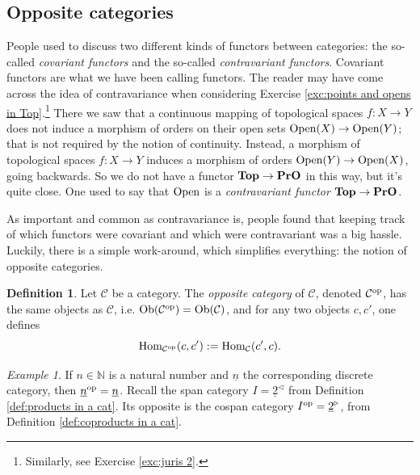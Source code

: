 \documentclass{book}
\def\tn{\textnormal}
\def\mc{\mathcal}
\def\NN{{\mathbb N}}
\def\Hom{\tn{Hom}}
\def\Ob{\tn{Ob}}
\def\Op{\tn{Open}}
\def\lcone{^\triangleleft}
\def\rcone{^\triangleright}
\def\to{\rightarrow}
\def\taking{\colon}
\def\op{^\tn{op}}
\def\ul{\underline}
\def\Top{{\bf Top}}
\def\PrO{{\bf PrO}}
\def\mcC{\mc{C}}
\theoremstyle{remark}
\newtheorem{example}[subsubsection]{Example}
\theoremstyle{definition}
\newtheorem{definition}[subsubsection]{Definition}
\begin{document}

\subsection{Opposite categories}\label{sec:opposite}

People used to discuss two different kinds of functors between categories: the so-called {\em covariant functors} and the so-called {\em contravariant functors}. Covariant functors are what we have been calling functors. The reader may have come across the idea of contravariance when considering Exercise \ref{exc:points and opens in Top}.\footnote{Similarly, see Exercise \ref{exc:juris 2}.} There we saw that a continuous mapping of topological spaces $f\taking X\to Y$ does not induce a morphism of orders on their open sets $\Op(X)\to\Op(Y)$; that is not required by the notion of continuity. Instead, a morphism of topological spaces $f\taking X\to Y$ induces a morphism of orders $\Op(Y)\to\Op(X)$, going backwards. So we do not have a functor $\Top\to\PrO$ in this way, but it's quite close. One used to say that $\Op$ is a {\em contravariant functor} $\Top\to\PrO$.

As important and common as contravariance is, people found that keeping track of which functors were covariant and which were contravariant was a big hassle. Luckily, there is a simple work-around, which simplifies everything: the notion of opposite categories.

\begin{definition}

Let $\mcC$ be a category. The {\em opposite category} of $\mcC$, denoted $\mcC\op$,\index{a symbol!$\mcC\op$} has the same objects as $\mcC$, i.e. $\Ob(\mcC\op)=\Ob(\mcC)$, and for any two objects $c,c'$, one defines
$$\Hom_{\mcC\op}(c,c'):=\Hom_\mcC(c',c).$$

\end{definition}

\begin{example}

If $n\in\NN$ is a natural number and $\ul{n}$ the corresponding discrete category, then $\ul{n}\op=\ul{n}$. Recall  the span category $I=\ul{2}\lcone$ from Definition \ref{def:products in a cat}. Its opposite is the cospan category $I\op=\ul{2}\rcone$, from Definition \ref{def:coproducts in a cat}.

\end{example}
\end{document}
